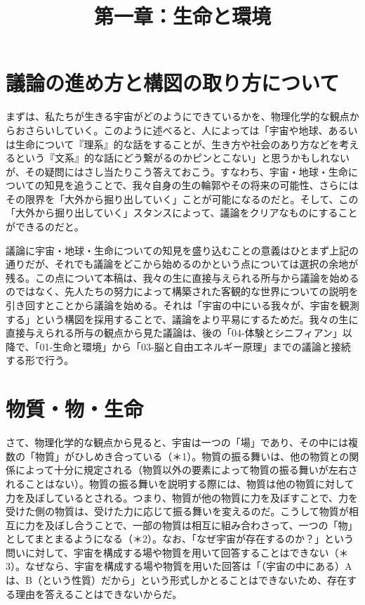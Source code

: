 \documentclass[8pt, a5paper]{ltjsarticle}
\title{第一章：生命と環境}
\author{}
\date{}
\author{}
\date{}
\begin{document}
\maketitle

\section{議論の進め方と構図の取り方について}\label{ux8b70ux8ad6ux306eux9032ux3081ux65b9ux3068ux69cbux56f3ux306eux53d6ux308aux65b9ux306bux3064ux3044ux3066}

まずは、私たちが生きる宇宙がどのようにできているかを、物理化学的な観点からおさらいしていく。このように述べると、人によっては「宇宙や地球、あるいは生命について『理系』的な話をすることが、生き方や社会のあり方などを考えるという『文系』的な話にどう繋がるのかピンとこない」と思うかもしれないが、その疑問にはさし当たりこう答えておこう。すなわち、宇宙・地球・生命についての知見を追うことで、我々自身の生の輪郭やその将来の可能性、さらにはその限界を「大外から掘り出していく」ことが可能になるのだと。そして、この「大外から掘り出していく」スタンスによって、議論をクリアなものにすることができるのだと。

議論に宇宙・地球・生命についての知見を盛り込むことの意義はひとまず上記の通りだが、それでも議論をどこから始めるのかという点については選択の余地が残る。この点について本稿は、我々の生に直接与えられる所与から議論を始めるのではなく、先人たちの努力によって構築された客観的な世界についての説明を引き回すとことから議論を始める。それは「宇宙の中にいる我々が、宇宙を観測する」という構図を採用することで、議論をより平易にするためだ。我々の生に直接与えられる所与の観点から見た議論は、後の「04-体験とシニフィアン」以降で、「01-生命と環境」から「03-脳と自由エネルギー原理」までの議論と接続する形で行う。

\section{物質・物・生命}\label{ux7269ux8ceaux7269ux751fux547d}

さて、物理化学的な観点から見ると、宇宙は一つの「場」であり、その中には複数の「物質」がひしめき合っている（＊1）。物質の振る舞いは、他の物質との関係によって十分に規定される（物質以外の要素によって物質の振る舞いが左右されることはない）。物質の振る舞いを説明する際には、物質は他の物質に対して力を及ぼしているとされる。つまり、物質が他の物質に力を及ぼすことで、力を受けた側の物質は、受けた力に応じて振る舞いを変えるのだ。こうして物質が相互に力を及ぼし合うことで、一部の物質は相互に組み合わさって、一つの「物」としてまとまるようになる（＊2）。なお、「なぜ宇宙が存在するのか？」という問いに対して、宇宙を構成する場や物質を用いて回答することはできない（＊3）。なぜなら、宇宙を構成する場や物質を用いた回答は「（宇宙の中にある）Aは、B（という性質）だから」という形式しかとることはできないため、存在する理由を答えることはできないからだ。
\end{document}
